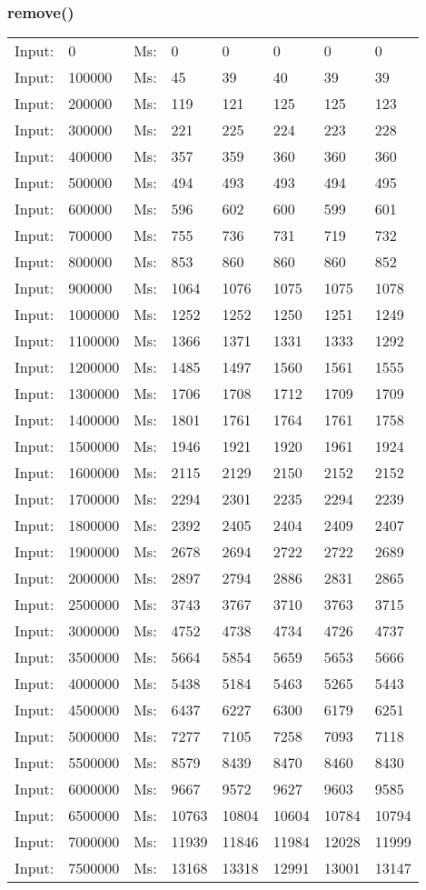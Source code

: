 \documentclass[11pt,a4paper]{report}
\begin{document}
\begin{tiny}
\subsubsection*{remove()}
\begin{tabular}{l l ||l  l  l  l  l  l}
Input:&0&Ms:&0&0&0&0&0\\
Input:&100000&Ms:&45&39&40&39&39\\
Input:&200000&Ms:&119&121&125&125&123\\
Input:&300000&Ms:&221&225&224&223&228\\
Input:&400000&Ms:&357&359&360&360&360\\
Input:&500000&Ms:&494&493&493&494&495\\
Input:&600000&Ms:&596&602&600&599&601\\
Input:&700000&Ms:&755&736&731&719&732\\
Input:&800000&Ms:&853&860&860&860&852\\
Input:&900000&Ms:&1064&1076&1075&1075&1078\\
Input:&1000000&Ms:&1252&1252&1250&1251&1249\\
Input:&1100000&Ms:&1366&1371&1331&1333&1292\\
Input:&1200000&Ms:&1485&1497&1560&1561&1555\\
Input:&1300000&Ms:&1706&1708&1712&1709&1709\\
Input:&1400000&Ms:&1801&1761&1764&1761&1758\\
Input:&1500000&Ms:&1946&1921&1920&1961&1924\\
Input:&1600000&Ms:&2115&2129&2150&2152&2152\\
Input:&1700000&Ms:&2294&2301&2235&2294&2239\\
Input:&1800000&Ms:&2392&2405&2404&2409&2407\\
Input:&1900000&Ms:&2678&2694&2722&2722&2689\\
Input:&2000000&Ms:&2897&2794&2886&2831&2865\\
Input:&2500000&Ms:&3743&3767&3710&3763&3715\\
Input:&3000000&Ms:&4752&4738&4734&4726&4737\\
Input:&3500000&Ms:&5664&5854&5659&5653&5666\\
Input:&4000000&Ms:&5438&5184&5463&5265&5443\\
Input:&4500000&Ms:&6437&6227&6300&6179&6251\\
Input:&5000000&Ms:&7277&7105&7258&7093&7118\\
Input:&5500000&Ms:&8579&8439&8470&8460&8430\\
Input:&6000000&Ms:&9667&9572&9627&9603&9585\\
Input:&6500000&Ms:&10763&10804&10604&10784&10794\\
Input:&7000000&Ms:&11939&11846&11984&12028&11999\\
Input:&7500000&Ms:&13168&13318&12991&13001&13147\\
\end{tabular}


\end{tiny}
\end{document}
